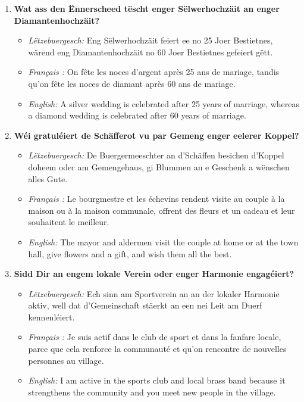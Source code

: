 \begin{enumerate}
    \item \textbf{Wat ass den Ënnerscheed tëscht enger Sëlwerhochzäit an enger Diamantenhochzäit?}
    \begin{itemize}
        \item \textit{Lëtzebuergesch:} Eng Sëlwerhochzäit feiert ee no 25 Joer Bestietnes, wärend eng Diamantenhochzäit no 60 Joer Bestietnes gefeiert gëtt.
        \item \textit{Français :} On fête les noces d'argent après 25 ans de mariage, tandis qu'on fête les noces de diamant après 60 ans de mariage.
        \item \textit{English:} A silver wedding is celebrated after 25 years of marriage, whereas a diamond wedding is celebrated after 60 years of marriage.
    \end{itemize}

    \item \textbf{Wéi gratuléiert de Schäfferot vu par Gemeng enger eelerer Koppel?}
    \begin{itemize}
        \item \textit{Lëtzebuergesch:} De Buergermeeschter an d'Schäffen besichen d'Koppel doheem oder am Gemengehaus, gi Blummen an e Geschenk a wënschen alles Gute.
        \item \textit{Français :} Le bourgmestre et les échevins rendent visite au couple à la maison ou à la maison communale, offrent des fleurs et un cadeau et leur souhaitent le meilleur.
        \item \textit{English:} The mayor and aldermen visit the couple at home or at the town hall, give flowers and a gift, and wish them all the best.
    \end{itemize}

    \item \textbf{Sidd Dir an engem lokale Verein oder enger Harmonie engagéiert?}
    \begin{itemize}
        \item \textit{Lëtzebuergesch:} Ech sinn am Sportverein an an der lokaler Harmonie aktiv, well dat d'Gemeinschaft stäerkt an een nei Leit am Duerf kennenléiert.
        \item \textit{Français :} Je suis actif dans le club de sport et dans la fanfare locale, parce que cela renforce la communauté et qu'on rencontre de nouvelles personnes au village.
        \item \textit{English:} I am active in the sports club and local brass band because it strengthens the community and you meet new people in the village.
    \end{itemize}


\end{enumerate}
